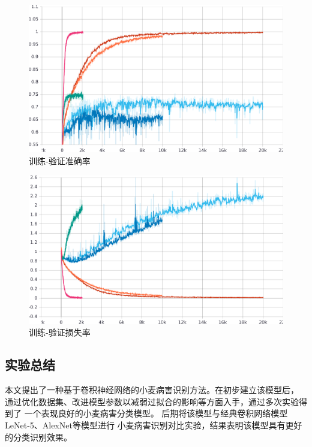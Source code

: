   \begin{figure}[H]
    \centering
    \includegraphics[width=.8\textwidth]{resource/epoch_accuracy.eps}
    \caption{训练-验证准确率}
    \label{Figure.Fourth.2}
  \end{figure}
  \begin{figure}[H]
    \centering
    \includegraphics[width=.8\textwidth]{resource/epoch_loss.eps}
    \caption{训练-验证损失率}
    \label{Figure.Fourth.3}
  \end{figure}

\subsection{\hei\xiaosan\textbf{实验总结}}
  本文提出了一种基于卷积神经网络的小麦病害识别方法。在初步建立该模型后，
  通过优化数据集、改进模型参数以减弱过拟合的影响等方面入手，通过多次实验得到了
  一个表现良好的小麦病害分类模型。
  后期将该模型与经典卷积网络模型LeNet-5、AlexNet等模型进行\zs 
  小麦病害识别对比实验，结果表明该模型具有更好的分类识别效果。